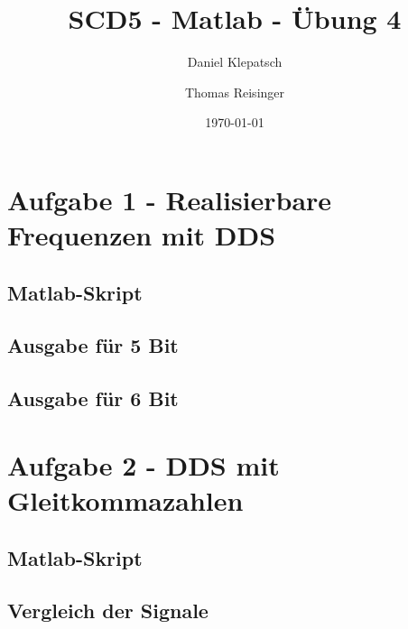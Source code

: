 


\title{SCD5 - Matlab - Übung 4}
\date{\today}
\author{Daniel Klepatsch \and Thomas Reisinger}
        
\maketitle

\newpage



\tableofcontents

\newpage

\section{Aufgabe 1 - Realisierbare Frequenzen mit DDS}

\subsection{Matlab-Skript}


\subsection{Ausgabe für 5 Bit}


\newpage

\subsection{Ausgabe für 6 Bit}


\newpage

\section{Aufgabe 2 - DDS mit Gleitkommazahlen}

\subsection{Matlab-Skript}


\newpage

\subsection{Vergleich der Signale}

